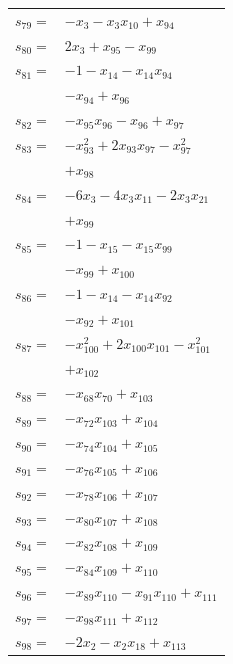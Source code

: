 \begin{longtable}{@{}r@{\;}l@{}}
\(s_{79}=\) & \(\displaystyle -x_{3} -x_{3}x_{10} +x_{94}\) \\[3pt]
\(s_{80}=\) & \(\displaystyle 2x_{3} +x_{95} -x_{99}\) \\[3pt]
\(s_{81}=\) & \(\displaystyle -1 -x_{14} -x_{14}x_{94}\) \\
 & \(\displaystyle -x_{94} +x_{96}\) \\[3pt]
\(s_{82}=\) & \(\displaystyle -x_{95}x_{96} -x_{96} +x_{97}\) \\[3pt]
\(s_{83}=\) & \(\displaystyle -x_{93}^{2} +2x_{93}x_{97} -x_{97}^{2}\) \\
 & \(\displaystyle +x_{98}\) \\[3pt]
\(s_{84}=\) & \(\displaystyle -6x_{3} -4x_{3}x_{11} -2x_{3}x_{21}\) \\
 & \(\displaystyle +x_{99}\) \\[3pt]
\(s_{85}=\) & \(\displaystyle -1 -x_{15} -x_{15}x_{99}\) \\
 & \(\displaystyle -x_{99} +x_{100}\) \\[3pt]
\(s_{86}=\) & \(\displaystyle -1 -x_{14} -x_{14}x_{92}\) \\
 & \(\displaystyle -x_{92} +x_{101}\) \\[3pt]
\(s_{87}=\) & \(\displaystyle -x_{100}^{2} +2x_{100}x_{101} -x_{101}^{2}\) \\
 & \(\displaystyle +x_{102}\) \\[3pt]
\(s_{88}=\) & \(\displaystyle -x_{68}x_{70} +x_{103}\) \\[3pt]
\(s_{89}=\) & \(\displaystyle -x_{72}x_{103} +x_{104}\) \\[3pt]
\(s_{90}=\) & \(\displaystyle -x_{74}x_{104} +x_{105}\) \\[3pt]
\(s_{91}=\) & \(\displaystyle -x_{76}x_{105} +x_{106}\) \\[3pt]
\(s_{92}=\) & \(\displaystyle -x_{78}x_{106} +x_{107}\) \\[3pt]
\(s_{93}=\) & \(\displaystyle -x_{80}x_{107} +x_{108}\) \\[3pt]
\(s_{94}=\) & \(\displaystyle -x_{82}x_{108} +x_{109}\) \\[3pt]
\(s_{95}=\) & \(\displaystyle -x_{84}x_{109} +x_{110}\) \\[3pt]
\(s_{96}=\) & \(\displaystyle -x_{89}x_{110} -x_{91}x_{110} +x_{111}\) \\[3pt]
\(s_{97}=\) & \(\displaystyle -x_{98}x_{111} +x_{112}\) \\[3pt]
\(s_{98}=\) & \(\displaystyle -2x_{2} -x_{2}x_{18} +x_{113}\) \\[3pt]

\end{longtable}
